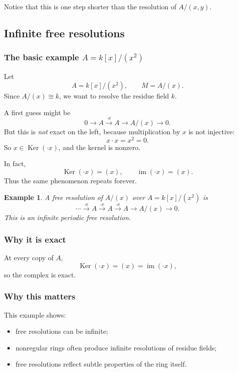 \documentclass[12pt,a4paper]{article}
\theoremstyle{notespace}
\DeclareMathOperator{\im}{im}
\newtheorem{example}[definition]{Example}
\newcommand{\kerf}{\operatorname{Ker}}
\begin{document}
Notice that this is one step shorter than the resolution of \(A/(x,y)\).

\subsection{Infinite free resolutions}

\subsubsection{The basic example \(A=k[x]/(x^2)\)}

Let
\[
A=k[x]/(x^2),
\qquad M=A/(x).
\]
Since \(A/(x)\cong k\), we want to resolve the residue field \(k\).

A first guess might be
\[
0\to A \xrightarrow{\cdot x} A \to A/(x)\to 0.
\]
But this is \emph{not} exact on the left, because multiplication by \(x\) is not injective:
\[
x\cdot x = x^2 = 0.
\]
So \(x\in \kerf(\cdot x)\), and the kernel is nonzero.

In fact,
\[
\kerf(\cdot x)=(x),
\qquad
\im(\cdot x)=(x).
\]
Thus the same phenomenon repeats forever.

\begin{example}
	A free resolution of \(A/(x)\) over \(A=k[x]/(x^2)\) is
	\[
	\cdots \xrightarrow{\cdot x} A \xrightarrow{\cdot x} A \xrightarrow{\cdot x} A \to A/(x)\to 0.
	\]
	This is an infinite periodic free resolution.
\end{example}

\subsubsection{Why it is exact}

At every copy of \(A\),
\[
\kerf(\cdot x)=(x)=\im(\cdot x),
\]
so the complex is exact.

\subsubsection{Why this matters}

This example shows:
\begin{itemize}[leftmargin=2em]
	\item free resolutions can be infinite;
	\item nonregular rings often produce infinite resolutions of residue fields;
	\item free resolutions reflect subtle properties of the ring itself.
\end{itemize}
\end{document}
